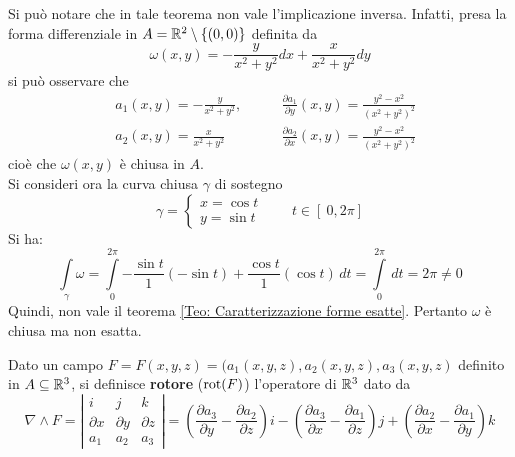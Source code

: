 \begin{example}
    Si può notare che in tale teorema non vale l'implicazione inversa. Infatti, presa la forma differenziale in $A=\mathbb{R}^2\setminus \left\{ (0,0)\right\} $ definita da
    \begin{equation*}
        \omega(x,y)= - \frac{y}{x^2+y^2}dx+ \frac{x}{x^2+y^2}dy
    \end{equation*}
    si può osservare che
    \begin{equation*}
        \begin{aligned}
            &a_1(x, y)= - \frac{y}{x^2+y^2}, \qquad &\frac{\partial a_1}{\partial y} (x, y) = \frac{y^2-x^2}{\left(x^2+y^2 \right)^2} \\
            &a_2(x,y)= \frac{x}{x^2+y^2} \qquad &\frac{\partial a_2}{\partial x} (x, y) = \frac{y^2-x^2}{\left(x^2+y^2 \right)^2}
        \end{aligned}
    \end{equation*}
    cioè che $\omega(x,y)$ è chiusa in $A$.\\
    Si consideri ora la curva chiusa $\gamma$ di sostegno
    \begin{equation*}
        \gamma= \begin{cases}
            x= \cos t\\
            y= \sin t
        \end{cases}
        \qquad t \in \left[\ 0, 2 \pi \right]
    \end{equation*}
    Si ha:
    \begin{equation*}
    \int\limits_{\gamma}{\omega}= \int\limits_{0}^{2\pi}{- \frac{\sin t}{1} (-\sin t) + \frac{\cos t}{1} (\cos t)}\, dt = \int\limits_{0}^{2\pi}{\,dt}= 2\pi \neq 0
    \end{equation*}
    Quindi, non vale il teorema \ref{Teo: Caratterizzazione forme esatte}. Pertanto $\omega$ è chiusa ma non esatta.
\end{example}
\begin{definition} \label{Def: Rotore}
Dato un campo $F= F(x,y,z)= (a_1(x,y,z), a_2(x,y,z), a_3(x,y,z)$ definito in $A \subseteq \mathbb{R}^3$, si definisce \textbf{rotore} ($\operatorname{rot}(F)$) l'operatore di $\mathbb{R}^3$ dato da
\begin{equation*}
\nabla \wedge F = \left| \begin{matrix}
    i & j & k \\
    \partial x & \partial y & \partial z\\
    a_1 & a_2 & a_3
\end{matrix}
\right|
= \left( \frac{\partial a_3}{\partial y} - \frac{\partial a_2}{\partial z} \right)i - \left( \frac{\partial a_3}{\partial x} - \frac{\partial a_1}{\partial z} \right)j + \left( \frac{\partial a_2}{\partial x} - \frac{\partial a_1}{\partial y}\right)k 
\end{equation*}
\end{definition}
